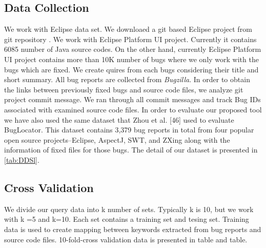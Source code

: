 \documentclass[conference]{IEEEtran}
\begin{document}
\subsection{Data Collection}
We work with Eclipse data set. We downloaed a git based Eclipse project from git repository \cite{eclipseGit}. We work with Eclipse Platform UI project. Currently it contains 6085 number of Java source codes. 
On the other hand, currently Eclipse Platform UI project contains more than 10K number of bugs where we only work with the bugs which are fixed. We create quires from each bugs considering their title and short summary.
All bug reports are collected from \textit{Bugzilla}. In order to obtain the links between previously fixed bugs and source code files, we analyze git project commit message. We ran through all commit messages and track Bug IDs associated with examined source code files. 
In order to evaluate our proposed tool we have also used the same dataset that Zhou et al. [46] used
to evaluate BugLocator. This dataset contains 3,379 bug reports in total from four popular open source projects–Eclipse, AspectJ, SWT, and ZXing along with the information of fixed files for those bugs. The detail of our dataset is presented in \ref{tab:DDSl}.

\subsection{Cross Validation}
We divide our query data into k number of sets. Typically k is 10, but we work with k =5 and k=10. Each set contains a training set and tesing set. Training data is used to create mapping between keywords extracted from bug reports and source code files. 10-fold-cross validation data is presented in table and table.
\end{document}

